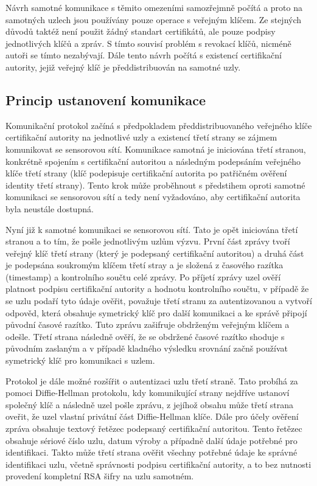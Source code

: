\documentclass[11pt,final,twoside]{fithesis2}
\begin{document}
Návrh samotné komunikace s těmito omezeními samozřejmně počítá a proto na samotných uzlech jsou používány
pouze operace s veřejným klíčem. Ze stejných důvodů taktéž není použit žádný standart certifikátů, ale 
pouze podpisy jednotlivých klíčů a zpráv. S tímto souvisí problém s revokací klíčů, nicméně autoři se tímto nezabývají.
Dále tento návrh počítá s existencí certifikační autority, jejiž veřejný klíč je předdistribuován na samotné uzly. 

\subsection{Princip ustanovení komunikace}
Komunikační protokol začíná s předpokladem předdistribuovaného veřejného klíče certifikační autority na jednotlivé
uzly a existencí třetí strany se zájmem komunikovat se sensorovou sítí. Komunikace samotná je iniciována třetí
stranou, konkrétně spojením s certifikační autoritou a následným podepsáním veřejného klíče třetí strany (klíč podepisuje 
certifikační autorita po patřičném ověření identity třetí strany). Tento krok může proběhnout s předstihem oproti samotné 
komunikaci se sensorovou sítí a tedy není vyžadováno, aby certifikační autorita byla neustále dostupná. 

Nyní již k samotné komunikaci se sensorovou sítí. Tato je opět iniciována třetí stranou a to tím, že pošle jednotlivým uzlům 
výzvu. První část zprávy tvoří veřejný klíč třetí strany (který je podepsaný certifikační autoritou) a druhá část je podepsána 
soukromým klíčem třetí stray a je složená z časového razítka (timestamp) a kontrolního součtu celé zprávy. Po příjetí zprávy
uzel ověří platnost podpisu certifikační autority a hodnotu kontrolního součtu, v případě že se uzlu podaří tyto údaje ověřit, 
považuje třetí stranu za autentizovanou a vytvoří odpověd, která obsahuje symetrický klíč pro další komunikaci a ke správě připojí 
původní časové razítko. Tuto zprávu zašifruje obdrženým veřejným klíčem a odešle. Třetí strana následně ověří, že se obdržené 
časové razítko shoduje s původním zaslaným a v případě kladného výsledku srovnání začnš používat symetrický klíč pro 
komunikaci s uzlem. 

Protokol je dále možné rozšířit o autentizaci uzlu třetí straně. Tato probíhá za pomoci Diffie-Hellman protokolu\cite{Diffie1976}, 
kdy komunikující strany nejdříve ustanoví společný klíč a následně uzel pošle zprávu, z jejíhož obsahu může třetí strana oveřit,
že uzel vlastní privátní část Diffie-Hellman klíče. Dále pro účely ověření zpráva obsahuje  textový řetězec podepsaný 
certifikační autoritou. Tento řetězec obsahuje sériové číslo uzlu, datum výroby a případně další údaje potřebné pro identifikaci. 
Takto může třetí strana ověřit všechny potřebné údaje ke správné identifikaci uzlu, včetně správnosti podpisu certifikační autority, 
a to bez nutnosti provedení kompletní RSA šifry na uzlu samotném.
\end{document}
